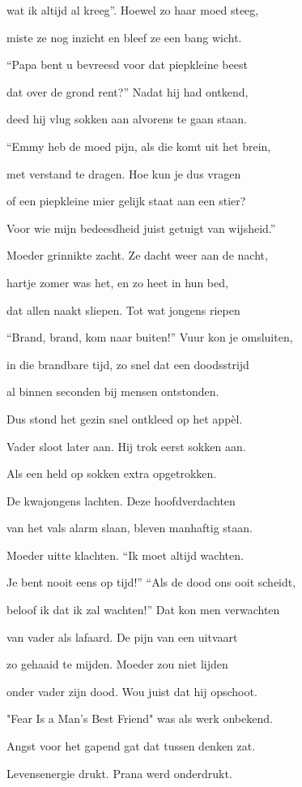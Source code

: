 wat ik altijd al kreeg”.
Hoewel zo haar moed steeg,

miste ze nog inzicht
en bleef ze een bang wicht.

“Papa bent u bevreesd
voor dat piepkleine beest

dat over de grond rent?”
Nadat hij had ontkend,

deed hij vlug sokken aan
alvorens te gaan staan.

“Emmy heb de moed pijn,
als die komt uit het brein,

met verstand te dragen.
Hoe kun je dus vragen

of een piepkleine mier
gelijk staat aan een stier?

Voor wie mijn bedeesdheid
juist getuigt van wijsheid.”

Moeder grinnikte zacht.
Ze dacht weer aan de nacht,

hartje zomer was het,
en zo heet in hun bed,

dat allen naakt sliepen.
Tot wat jongens riepen

“Brand, brand, kom naar buiten!”
Vuur kon je omsluiten,

in die brandbare tijd,
zo snel dat een doodsstrijd

al binnen seconden
bij mensen ontstonden.

Dus stond het gezin snel
ontkleed op het appèl.

Vader sloot later aan.
Hij trok eerst sokken aan.

Als een held op sokken
extra opgetrokken.

De kwajongens lachten.
Deze hoofdverdachten

van het vals alarm slaan,
bleven manhaftig staan.

Moeder uitte klachten.
“Ik moet altijd wachten.

Je bent nooit eens op tijd!”
“Als de dood ons ooit scheidt,

beloof ik dat ik zal wachten!”
Dat kon men verwachten

van vader als lafaard.
De pijn van een uitvaart

zo gehaaid te mijden.
Moeder zou niet lijden

onder vader zijn dood.
Wou juist dat hij opschoot.

"Fear Is a Man's Best Friend"
was als werk onbekend.

Angst voor het gapend gat
dat tussen denken zat.

Levensenergie drukt.
Prana werd onderdrukt.

